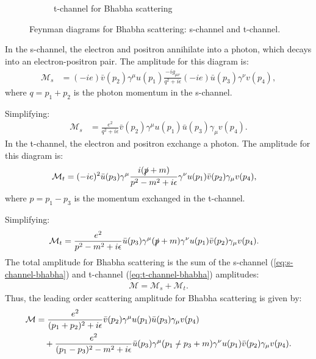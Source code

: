 \begin{enumerate}
\begin{figure}[h!]
    \hfill
    \begin{subfigure}[b]{0.45\textwidth}
        \centering
        \caption{t-channel for Bhabha scattering}
    \end{subfigure}
    \caption{Feynman diagrams for Bhabha scattering: s-channel and t-channel.}
\end{figure}
In the s-channel, the electron and positron annihilate into a photon, which decays into an electron-positron pair. The amplitude for this diagram is:
\begin{align}
    \mathcal{M}_s &= (-ie) \bar{v}(p_2) \gamma^\mu u(p_1) \frac{-ig_{\mu\nu}}{q^2 + i\epsilon} (-ie) \bar{u}(p_3) \gamma^\nu v(p_4), \label{eq:s-channel-bhabha}
\end{align}
where $q = p_1 + p_2$ is the photon momentum in the s-channel.

Simplifying:
\begin{align}
    \mathcal{M}_s &= \frac{e^2}{q^2 + i\epsilon} \bar{v}(p_2) \gamma^\mu u(p_1) \bar{u}(p_3) \gamma_\mu v(p_4).
\end{align}
In the t-channel, the electron and positron exchange a photon. The amplitude for this diagram is:
\begin{align}
    \mathcal{M}_t &= (-ie)^2 \bar{u}(p_3) \gamma^\mu \frac{i(\slashed{p} + m)}{p^2 - m^2 + i\epsilon} \gamma^\nu u(p_1) \bar{v}(p_2) \gamma_\mu v(p_4), \label{eq:t-channel-bhabha}
\end{align}
where $p = p_1 - p_3$ is the momentum exchanged in the t-channel.

Simplifying:
\begin{align}
    \mathcal{M}_t &= \frac{e^2}{p^2 - m^2 + i\epsilon} \bar{u}(p_3) \gamma^\mu (\slashed{p} + m) \gamma^\nu u(p_1) \bar{v}(p_2) \gamma_\mu v(p_4).
\end{align}
The total amplitude for Bhabha scattering is the sum of the s-channel (\ref{eq:s-channel-bhabha}) and t-channel (\ref{eq:t-channel-bhabha}) amplitudes:
\begin{align*}
    \mathcal{M} = \mathcal{M}_s + \mathcal{M}_t.
\end{align*}
Thus, the leading order scattering amplitude for Bhabha scattering is given by:
\begin{align}
    \mathcal{M} &= \frac{e^2}{(p_1 + p_2)^2 + i\epsilon} \bar{v}(p_2) \gamma^\mu u(p_1) \bar{u}(p_3) \gamma_\mu v(p_4) \nonumber \\
    &\quad + \frac{e^2}{(p_1 - p_3)^2 - m^2 + i\epsilon} \bar{u}(p_3) \gamma^\mu (\slashed{p_1 - p_3} + m) \gamma^\nu u(p_1) \bar{v}(p_2) \gamma_\mu v(p_4).
\end{align}
\end{enumerate}
\bigskip\bigskip\hline\hline\bigskip